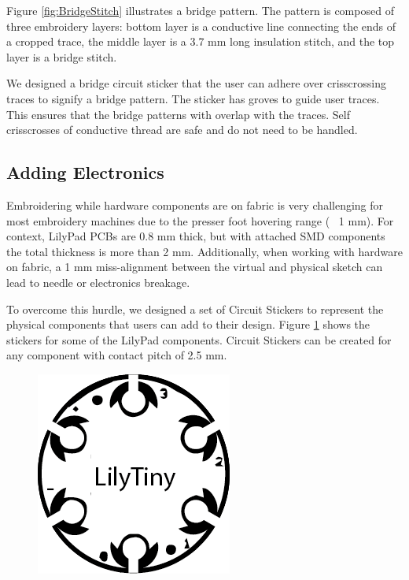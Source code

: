 \documentclass[header.tex]{subfiles}
\begin{document}
Figure \ref{fig:BridgeStitch} illustrates a bridge pattern. The pattern is composed of three embroidery layers: bottom layer is a conductive line connecting the ends of a cropped trace, the middle layer is a 3.7 mm long insulation stitch, and the top layer is a bridge stitch.

We designed a bridge circuit sticker that the user can adhere over crisscrossing traces to signify a bridge pattern. The sticker has groves to guide user traces. This ensures that the bridge patterns with overlap with the traces. Self crisscrosses of conductive thread are safe and do not need to be handled.



\subsection{Adding Electronics}
Embroidering while hardware components are on fabric is very challenging for most embroidery machines due to the presser foot hovering range (~ 1 mm). For context, LilyPad PCBs are 0.8 mm thick, but with attached SMD components the total thickness is more than 2 mm. Additionally, when working with hardware on fabric, a 1 mm miss-alignment between the virtual and physical sketch can lead to needle or electronics breakage. 

To overcome this hurdle, we designed a set of Circuit Stickers to represent the physical components that users can add to their design. Figure \ref{fig:BlackStickers} shows the stickers for some of the LilyPad components. Circuit Stickers can be created for any component with contact pitch of 2.5 mm. 
\begin{figure} [h!]
\centering
  \includegraphics[width=0.5\columnwidth]{figures/BlackStickers}
  \caption{}~\label{fig:BlackStickers}
  \vspace{-2.5em}
\end{figure}
\end{document}
